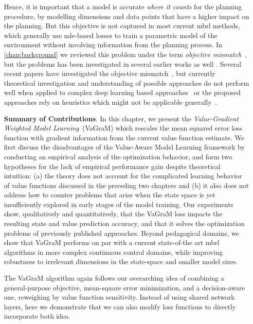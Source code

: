 Hence, it is important that a model is accurate \textit{where it counts} for the planning procedure, by modelling dimensions and data points that have a higher impact on the planning.
But this objective is not captured in most current \ac{mbrl} methods, which generally use \ac{mle}-based losses to train a parametric model of the environment without involving information from the planning process.
In \autoref{chap:background} we reviewed this problem under the term \emph{objective mismatch}~\parencite{lambert202objective}, but the problems has been investigated in several earlier works as well \parencite{joseph2013reinforcement}.
Several recent papers have investigated the objective mismatch~\parencite{abachi2020policy,zhang2021learning,ayoub2020model,grimm2020value,grimm2021proper,nikishin2021control}, but currently theoretical investigation and understanding of possible approaches do not perform well when applied to complex deep learning based approaches~\parencite{lovatto2020decision} or the proposed approaches rely on heuristics which might not be applicable generally~\parencite{nair2020goal}.

\noindent \textbf{Summary of Contributions}. In this chapter, we present the \textit{Value-Gradient Weighted Model Learning}~(VaGraM) which rescales the mean squared error loss function with gradient information from the current value function estimate.
We first discuss the disadvantages of the Value-Aware Model Learning framework \parencite{vaml, itervaml} by conducting an empirical analysis of the optimization behavior, and form two hypotheses for the lack of empirical performance gain despite theoretical intuition: (a) the theory does not account for the complicated learning behavior of value functions discussed in the preceding two chapters and (b) it also does not address how to counter problems that arise when the state space is yet insufficiently explored in early stages of the model training.
Our experiments show, qualitatively and quantitatively, that the VaGraM loss impacts the resulting state and value prediction accuracy, and that it solves the optimization problems of previously published approaches.
Beyond pedagogical domains, we show that VaGraM performs on par with a current state-of-the art \ac{mbrl} algorithms in more complex continuous control domains, while improving robustness to irrelevant dimensions in the state-space and smaller model sizes.

The VaGraM algorithm again follows our overarching idea of combining a general-purpose objective, mean-square error minimization, and a decision-aware one, reweighing by value function sensitivity.
Instead of using shared network layers, here we demonstrate that we can also modify loss functions to directly incorporate both idea.

